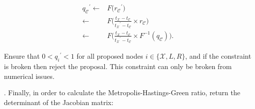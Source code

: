 \documentclass[12pt]{article}
\begin{document}
\begin{align}
	{q_\mathcal{C}}^\prime  \leftarrow & F\Big({r_\mathcal{C}}^\prime \Big) \nonumber\\
				\leftarrow & F\Big(\frac{t_\mathcal{X} - t_\mathcal{C}}{{t_\mathcal{X}}^\prime - t_\mathcal{C}} \times r_\mathcal{C} \Big) \nonumber\\
				\leftarrow & F\Big(\frac{t_\mathcal{X} - t_\mathcal{C}}{{t_\mathcal{X}}^\prime - t_\mathcal{C}} \times F^{-1}(q_\mathcal{C}) \Big).
\end{align}


Ensure that $0 < {q_i}^\prime < 1$ for all proposed nodes $i \in \{\mathcal{X}, L, R\}$, and if the constraint is broken then reject the proposal. 
This constraint can only be broken from numerical issues.





. Finally, in order to calculate the Metropolis-Hastings-Green ratio, return the determinant of the Jacobian matrix:
\end{document}
